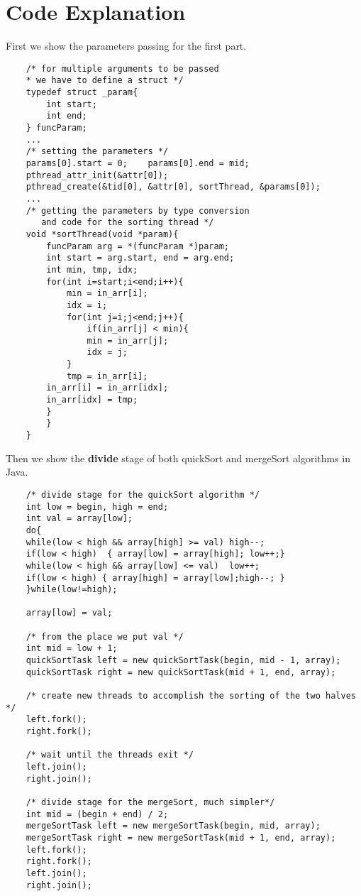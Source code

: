 \documentclass[12pt]{extarticle}
\newcommand{\<}{\langle}
\renewcommand{\>}{\rangle}
\theoremstyle{definition}
\begin{document}
	\section{Code Explanation}
	First we show the parameters passing for the first part.
	\begin{lstlisting}
	/* for multiple arguments to be passed 
	* we have to define a struct */
	typedef struct _param{
		int start;
		int end;
	} funcParam;
	...
	/* setting the parameters */
	params[0].start = 0;    params[0].end = mid; 
	pthread_attr_init(&attr[0]);
	pthread_create(&tid[0], &attr[0], sortThread, &params[0]);
	...
	/* getting the parameters by type conversion 
	   and code for the sorting thread */
	void *sortThread(void *param){
		funcParam arg = *(funcParam *)param;
		int start = arg.start, end = arg.end;
		int min, tmp, idx;
		for(int i=start;i<end;i++){
			min = in_arr[i];
			idx = i;
			for(int j=i;j<end;j++){
				if(in_arr[j] < min){
				min = in_arr[j];
				idx = j;
			}
			tmp = in_arr[i];
		in_arr[i] = in_arr[idx];
		in_arr[idx] = tmp;
		}
		}
	}
	\end{lstlisting}
	Then we show the \textbf{divide} stage of both quickSort and mergeSort algorithms in Java.
	\begin{lstlisting}
	/* divide stage for the quickSort algorithm */
	int low = begin, high = end;
	int val = array[low];
	do{
	while(low < high && array[high] >= val) high--;
	if(low < high)  { array[low] = array[high]; low++;}
	while(low < high && array[low] <= val)  low++;
	if(low < high) { array[high] = array[low];high--; }
	}while(low!=high);
	
	array[low] = val;
	
	/* from the place we put val */
	int mid = low + 1;
	quickSortTask left = new quickSortTask(begin, mid - 1, array);
	quickSortTask right = new quickSortTask(mid + 1, end, array);
	
	/* create new threads to accomplish the sorting of the two halves */
	left.fork();
	right.fork();
	
	/* wait until the threads exit */
	left.join();
	right.join();
	
	/* divide stage for the mergeSort, much simpler*/
	int mid = (begin + end) / 2;
	mergeSortTask left = new mergeSortTask(begin, mid, array);
	mergeSortTask right = new mergeSortTask(mid + 1, end, array);
	left.fork();
	right.fork();
	left.join();
	right.join();
	\end{lstlisting}
	
\end{document}
